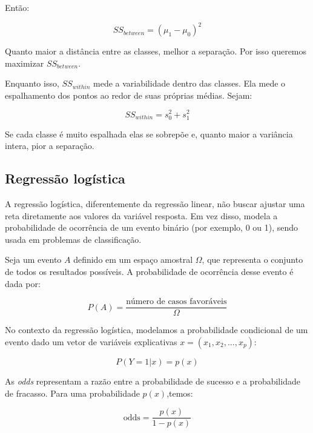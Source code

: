 \documentclass{article}
\begin{document}
Então:

\begin{equation*}
    SS_{between} = (\mu_1 - \mu_0)^2
\end{equation*}

Quanto maior a distância entre as classes, melhor a separação.
Por isso queremos maximizar $SS_{between}$.

Enquanto isso, $SS_{within}$ mede a variabilidade dentro das classes.
Ela mede o espalhamento dos pontos ao redor de suas próprias médias. Sejam:

\begin{equation*}
    SS_{within} = s_0^{2} + s_1^{2}
\end{equation*}

Se cada classe é muito espalhada elas se sobrepõe e, quanto maior a variância
intera, pior a separação. 

\subsection{Regressão logística}

A regressão logística, diferentemente da regressão linear, não buscar ajustar
uma reta diretamente aos valores da variável resposta. Em vez disso, modela a
probabilidade de ocorrência de um evento binário (por exemplo, 0 ou 1), sendo 
usada em problemas de classificação.

Seja um evento $A$ definido em um espaço amostral $\Omega$, que representa o 
conjunto de todos os resultados possíveis. A probabilidade de ocorrência desse 
evento é dada por:

\begin{equation}
    P(A) = \frac{\text{número de casos favoráveis}}{\Omega}
\end{equation}

No contexto da regressão logística, modelamos a probabilidade condicional de um
evento dado um vetor de variáveis explicativas $x = (x_1, x_2, ..., x_p)$:

\begin{equation}
    P(Y = 1 | x) = p(x)
\end{equation}

As \textit{odds} representam a razão entre a probabilidade de sucesso e a probabilidade
de fracasso. Para uma probabilidade $p(x)$,temos:

\begin{equation}
    \text{odds} = \frac{p(x)}{1 - p(x)}
\end{equation}
\end{document}
